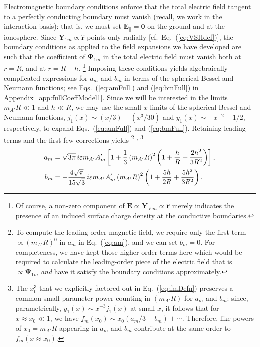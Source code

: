 \documentclass[amsmath,amssymb,aps,10pt,prd,letterpaper,nofootinbib,balancelastpage,notitlepage,superscriptaddress,twocolumn,floatfix]{revtex4-2}
\newcommand{\up}[1]{\textsuperscript{#1}}			%
\newcommand{\appref}[2][x]{Appendi{#1}~\ref{#2}}	%
\renewcommand{\eqref}[2][]{Eq{#1}.~(\ref{eq:#2})}	%
\newcommand{\lb}{\ensuremath{\left}}					%
\newcommand{\rb}{\ensuremath{\right}}					%
\begin{document}
Electromagnetic boundary conditions enforce that the total electric field tangent to a perfectly conducting boundary must vanish (recall, we work in the interaction basis): that is, we must set $\bm{E}_\parallel=\bm{0}$ on the ground and at the ionosphere.
Since $\bm{Y}_{1m} \propto \bm{\hat{r}}$ points only radially [cf.~\eqref{VSHdef}], the boundary conditions as applied to the field expansions we have developed are such that the coefficient of $\bm{\Psi}_{1m}$ in the total electric field must vanish both at $r=R$, and at $r=R+h$.%
\footnote{\label{ftnt:meaningOfY}%
    Of course, a non-zero component of $\bm{E} \propto \bm{Y}_{\ell m} \propto \bm{\hat{r}}$ merely indicates the presence of an induced surface charge density at the conductive boundaries.
} %
Imposing these conditions yields algebraically complicated expressions for $a_m$ and $b_m$ in terms of the spherical Bessel and Neumann functions; see \eqref[s]{amFull} and (\ref{eq:bmFull}) in \appref{app:fullCoeffModel1}.
Since we will be interested in the limits $m_{A'}R \ll 1$ and $h \ll R$, we may use the small-$x$ limits of the spherical Bessel and Neumann functions, $j_1(x)\sim(x/3)-(x^3/30)$ and $y_1(x)\sim-x^{-2}-1/2$, respectively, to expand \eqref[s]{amFull} and (\ref{eq:bmFull}).
Retaining leading terms and the first few corrections yields%
\footnote{\label{ftnt:orderexpansion}%
    To compute the leading-order magnetic field, we require only the first term $\propto (m_{A'}R)^0$ in $a_m$ in \eqref{am}, and we can set $b_m=0$.
    For completeness, we have kept those higher-order terms here which would be required to calculate the leading-order piece of the electric field that is $\propto \bm{\Psi}_{1m}$ \emph{and} have it satisfy the boundary conditions approximately.
}%
\up{,}%
\footnote{\label{ftnt:powerCounting}%
    The $x_0^3$ that we explicitly factored out in \eqref{fmDefn} preserves a common small-parameter power counting in $(m_{A'}R)$ for $a_m$ and $b_m$: since, parametrically, $y_1(x) \sim x^{-3} j_1(x)$ at small $x$, it follows that for $x \approx x_0 \ll 1$, we have $f_m(x_0) \sim x_0 ( a_m /3 - b_m) + \cdots$.
    Therefore, like powers of $x_0 = m_{A'}R$ appearing in $a_m$ and $b_m$ contribute at the same order to $f_m(x\approx x_0)$.
} %
\begin{align}
    a_m &= \sqrt{3\pi}\, i\varepsilon m_{A'}A'_m \lb[ 1 + \frac{1}{3} \lb(m_{A'}R\rb)^2 \lb( 1 + \frac{h}{R} + \frac{2h^2}{3R^2} \rb) \rb],
    \label{eq:am}\\
    b_m &= -\frac{4\sqrt{\pi}}{15\sqrt{3}}\,i\varepsilon m_{A'}A'_m \lb(m_{A'}R\rb)^2 \lb( 1 + \frac{5h}{2R} + \frac{5h^2}{3R^2} \rb).
    \label{eq:bm}
\end{align}
\end{document}
